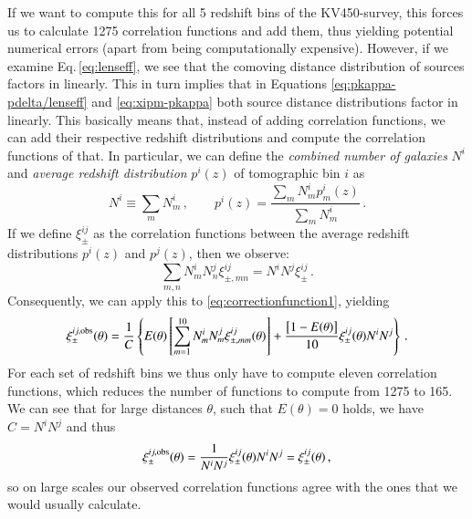 If we want to compute this for all 5 redshift bins of the KV450-survey, this forces us to calculate 1275 correlation functions and add them, thus yielding potential numerical errors (apart from being computationally expensive). However, if we examine Eq.\,\eqref{eq:lenseff}, we see that the comoving distance distribution of sources factors in linearly. This in turn implies that in Equations \eqref{eq:pkappa-pdelta/lenseff} and \eqref{eq:xipm-pkappa} both source distance distributions factor in linearly. This basically means that, instead of adding correlation functions, we can add their respective redshift distributions and compute the correlation functions of that. In particular, we can define the \textit{combined number of galaxies} $N^i$ and \textit{average redshift distribution} $p^i(z)$ of tomographic bin $i$ as \[
N^i\equiv\sum_m N_m^i\, , \qquad p^i(z) = \frac{\sum_m N_m^i p_m^i(z)}{\sum_m N_m^i} \, .
\]
If we define $\xi^{ij}_\pm$ as the correlation functions between the average redshift distributions $p^i(z)$ and $p^j(z)$, then we observe: \[
\sum_{m,n}N_m^iN_n^j\xi^{ij}_{\pm,mn} = N^iN^j\xi^{ij}_\pm\, .
\]
Consequently, we can apply this to \eqref{eq:correctionfunction1}, yielding
\begin{equation}
\xi_{\pm}^{ij,\rm{obs}}(\theta) = \frac{1}{C}\left\{ E(\theta)\left[\sum_{m=1}^{10} N_m^iN_m^j \xi_{\pm,mm}^{ij}(\theta)\right] +\frac{\big[1-E(\theta)\big]}{10}\xi_\pm^{ij}(\theta)N^iN^j\right\}\, .
\label{eq:correctionfunction2}
\end{equation}
For each set of redshift bins we thus only have to compute eleven correlation functions, which reduces the number of functions to compute from 1275 to 165. We can see that for large distances $\theta$, such that $E(\theta)=0$ holds, we have $C=N^iN^j$ and thus \[
\xi_{\pm}^{ij,\rm{obs}}(\theta) = \frac{1}{N^iN^j}\xi_\pm^{ij}(\theta)N^iN^j = \xi_\pm^{ij}(\theta)\, ,
\]
so on large scales our observed correlation functions agree with the ones that we would usually calculate.
